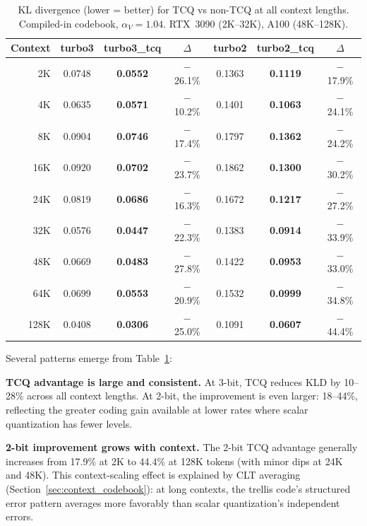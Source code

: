 \documentclass{article}
\begin{document}
\begin{table}[t]
\centering
\caption{KL divergence (lower = better) for TCQ vs non-TCQ at all context
lengths. Compiled-in codebook, $\alpha_V = 1.04$.
RTX~3090 (2K--32K), A100 (48K--128K).}
\label{tab:kld_tcq}
\begin{tabular}{@{}rcccccc@{}}
\toprule
Context & turbo3 & turbo3\_tcq & $\Delta$ & turbo2 & turbo2\_tcq & $\Delta$ \\
\midrule
2K   & 0.0748 & \textbf{0.0552} & $-$26.1\% & 0.1363 & \textbf{0.1119} & $-$17.9\% \\
4K   & 0.0635 & \textbf{0.0571} & $-$10.2\% & 0.1401 & \textbf{0.1063} & $-$24.1\% \\
8K   & 0.0904 & \textbf{0.0746} & $-$17.4\% & 0.1797 & \textbf{0.1362} & $-$24.2\% \\
16K  & 0.0920 & \textbf{0.0702} & $-$23.7\% & 0.1862 & \textbf{0.1300} & $-$30.2\% \\
24K  & 0.0819 & \textbf{0.0686} & $-$16.3\% & 0.1672 & \textbf{0.1217} & $-$27.2\% \\
32K  & 0.0576 & \textbf{0.0447} & $-$22.3\% & 0.1383 & \textbf{0.0914} & $-$33.9\% \\
\midrule
48K  & 0.0669 & \textbf{0.0483} & $-$27.8\% & 0.1422 & \textbf{0.0953} & $-$33.0\% \\
64K  & 0.0699 & \textbf{0.0553} & $-$20.9\% & 0.1532 & \textbf{0.0999} & $-$34.8\% \\
128K & 0.0408 & \textbf{0.0306} & $-$25.0\% & 0.1091 & \textbf{0.0607} & $-$44.4\% \\
\bottomrule
\end{tabular}
\end{table}

Several patterns emerge from Table~\ref{tab:kld_tcq}:

\textbf{TCQ advantage is large and consistent.} At 3-bit, TCQ reduces KLD by
10--28\% across all context lengths. At 2-bit, the improvement is even larger:
18--44\%, reflecting the greater coding gain available at lower rates where
scalar quantization has fewer levels.

\textbf{2-bit improvement grows with context.} The 2-bit TCQ advantage
generally increases from 17.9\% at 2K to 44.4\% at 128K tokens (with
minor dips at 24K and 48K). This
context-scaling effect is explained by CLT averaging
(Section~\ref{sec:context_codebook}): at long contexts, the trellis code's
structured error pattern averages more favorably than scalar quantization's
independent errors.
\end{document}
